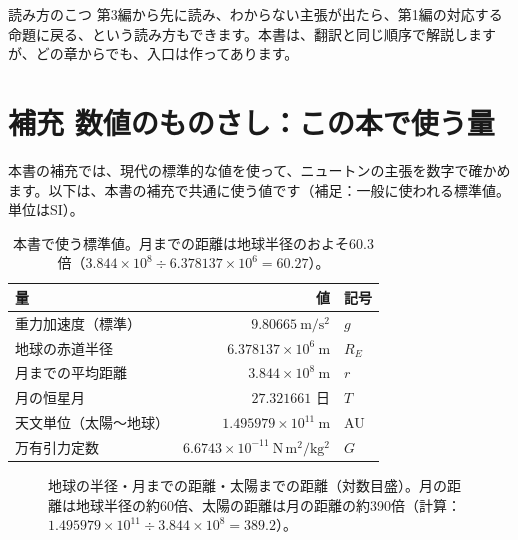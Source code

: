 \documentclass[a4paper,11pt,openany]{ltjsbook}
\begin{document}
\begin{notebox}{読み方のこつ}
第3編から先に読み、わからない主張が出たら、第1編の対応する命題に戻る、という読み方もできます。本書は、翻訳と同じ順序で解説しますが、どの章からでも、入口は作ってあります。
\end{notebox}

\section{補充 数値のものさし：この本で使う量}

本書の補充では、現代の標準的な値を使って、ニュートンの主張を数字で確かめます。以下は、本書の補充で共通に使う値です（補足：一般に使われる標準値。単位はSI）。

\begin{table}[htbp]
\centering
\begin{tabular}{lrl}
\toprule
量 & 値 & 記号\\
\midrule
重力加速度（標準） & $9.80665\ \mathrm{m/s^2}$ & $g$\\
地球の赤道半径 & $6.378137\times10^{6}\ \mathrm{m}$ & $R_E$\\
月までの平均距離 & $3.844\times10^{8}\ \mathrm{m}$ & $r$\\
月の恒星月 & $27.321661$ 日 & $T$\\
天文単位（太陽〜地球） & $1.495979\times10^{11}\ \mathrm{m}$ & AU\\
万有引力定数 & $6.6743\times10^{-11}\ \mathrm{N\,m^2/kg^2}$ & $G$\\
\bottomrule
\end{tabular}
\caption{本書で使う標準値。月までの距離は地球半径のおよそ60.3倍（$3.844\times10^8\div6.378137\times10^6=60.27$）。}
\end{table}

\begin{figure}[htbp]
\centering
{}
\caption{地球の半径・月までの距離・太陽までの距離（対数目盛）。月の距離は地球半径の約60倍、太陽の距離は月の距離の約390倍（計算：$1.495979\times10^{11}\div3.844\times10^{8}=389.2$）。}
\end{figure}
\end{document}
